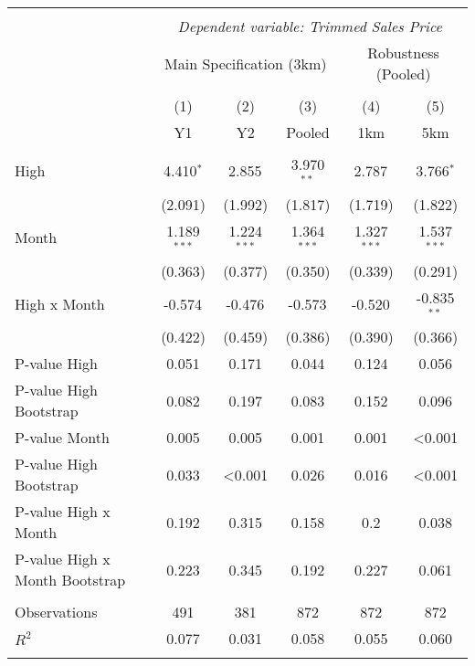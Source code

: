 \begin{tabular}{@{\extracolsep{5pt}}lccccc}
\\[-1.8ex]\hline
\hline \\[-1.8ex]
& \multicolumn{5}{c}{\textit{Dependent variable: Trimmed Sales Price}} \
\cr \cline{2-6}
\\[-1.8ex] & \multicolumn{3}{c}{Main Specification (3km)} & \multicolumn{2}{c}{Robustness (Pooled)}  \\
\\[-1.8ex] & (1) & (2) & (3) & (4) & (5) 
 \\ & Y1 & Y2 & Pooled & 1km & 5km \\
\hline \\[-1.8ex]
 High & 4.410$^{*}$ & 2.855$^{}$ & 3.970$^{**}$ & 2.787$^{}$ & 3.766$^{*}$ \\
& (2.091) & (1.992) & (1.817) & (1.719) & (1.822) \\
 Month & 1.189$^{***}$ & 1.224$^{***}$ & 1.364$^{***}$ & 1.327$^{***}$ & 1.537$^{***}$ \\
& (0.363) & (0.377) & (0.350) & (0.339) & (0.291) \\
 High x Month & -0.574$^{}$ & -0.476$^{}$ & -0.573$^{}$ & -0.520$^{}$ & -0.835$^{**}$ \\
& (0.422) & (0.459) & (0.386) & (0.390) & (0.366) \\
 P-value High & 0.051 & 0.171 & 0.044 & 0.124 & 0.056 \\
 P-value High Bootstrap & 0.082 & 0.197 & 0.083 & 0.152 & 0.096 \\
 P-value Month & 0.005 & 0.005 & 0.001 & 0.001 & <0.001 \\
 P-value High Bootstrap & 0.033 & <0.001 & 0.026 & 0.016 & <0.001 \\
 P-value High x Month & 0.192 & 0.315 & 0.158 & 0.2 & 0.038 \\
 P-value High x Month Bootstrap & 0.223 & 0.345 & 0.192 & 0.227 & 0.061 \\
\hline \\[-1.8ex]
 Observations & 491 & 381 & 872 & 872 & 872 \\
 $R^2$ & 0.077 & 0.031 & 0.058 & 0.055 & 0.060 \\
\hline
\hline \\[-1.8ex]
\end{tabular}
